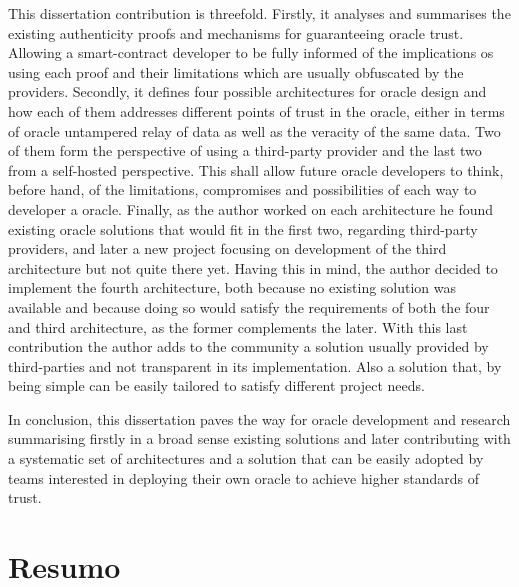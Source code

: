 This dissertation contribution is threefold. Firstly, it analyses and summarises the existing authenticity proofs and mechanisms for guaranteeing oracle trust. Allowing a smart-contract developer to be fully informed of the implications os using each proof and their limitations which are usually obfuscated by the providers. Secondly, it defines four possible architectures for oracle design and how each of them addresses different points of trust in the oracle, either in terms of oracle untampered relay of data as well as the veracity of the same data. Two of them form the perspective of using a third-party provider and the last two from a self-hosted perspective. This shall allow future oracle developers to think, before hand, of the limitations, compromises and possibilities of each way to developer a oracle. Finally, as the author worked on each architecture he found existing oracle solutions that would fit in the first two, regarding third-party providers, and later a new project focusing on development of the third architecture but not quite there yet. Having this in mind, the author decided to implement the fourth architecture, both because no existing solution was available and because doing so would satisfy the requirements of both the four and third architecture, as the former complements the later. With this last contribution the author adds to the community a solution usually provided by third-parties and not transparent in its implementation. Also a solution that, by being simple can be easily tailored to satisfy different project needs.

In conclusion, this dissertation paves the way for oracle development and research summarising firstly in a broad sense existing solutions and later contributing with a systematic set of architectures and a solution that can be easily adopted by teams interested in deploying their own oracle to achieve higher standards of trust.


\chapter*{Resumo}





